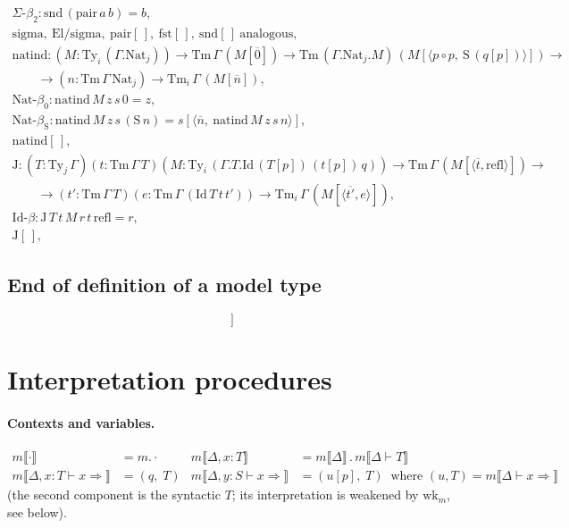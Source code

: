 \[\begin{array}{l}
    \Sigma\text{-}\beta_2 :
        \mathrm{snd}\,(\mathrm{pair}\,a\,b)=b,\\
    \mathrm{sigma},\ \mathrm{El/sigma},
    \ \mathrm{pair}[\,],\ \mathrm{fst}[\,],
    \ \mathrm{snd}[\,]\ \text{analogous},\\
    \mathrm{natind} :
        (M:\mathrm{Ty}_i\,(\Gamma.\mathrm{Nat}_j))
        \to\mathrm{Tm}\,\Gamma\,(M[\overline 0])
        \to\mathrm{Tm}\,(\Gamma.\mathrm{Nat}_j.M)\,
        (M[\langle p\circ p,\ \mathrm S\,(q[p])\rangle])
        \to\\\qquad
        \to(n:\mathrm{Tm}\,\Gamma\,\mathrm{Nat}_j)
        \to\mathrm{Tm}_i\,\Gamma\,(M[\overline n]),\\
    \mathrm{Nat}\text{-}\beta_0 :
        \mathrm{natind}\,M\,z\,s\,0=z,\\
    \mathrm{Nat}\text{-}\beta_{\mathrm S} :
        \mathrm{natind}\,M\,z\,s\,(\mathrm S\,n)=
        s[\langle\overline n,\ \mathrm{natind}\,M\,z\,s
        \,n\rangle],\\
    \mathrm{natind}[\,],\\
    \mathrm J : (T:\mathrm{Ty}_j\,\Gamma)
        (t:\mathrm{Tm}\,\Gamma\,T)
        (M:\mathrm{Ty}_i\,(\Gamma.T.
            \mathrm{Id}\,(T[p])\,(t[p])\,q))
        \to\mathrm{Tm}\,\Gamma\,
            (M[\langle\overline t,\mathrm{refl}\rangle])
            \to\\
        \qquad\to(t':\mathrm{Tm}\,\Gamma\,T)
        (e:\mathrm{Tm}\,\Gamma\,(\mathrm{Id}\,T\,t\,t'))
        \to\mathrm{Tm}_i\,\Gamma\,
        (M[\langle\overline{t'},e\rangle]),\\
    \mathrm{Id}\text{-}\beta :
        \mathrm J\,T\,t\,M\,r\,t\,\mathrm{refl}=
        r,\\ \mathrm J[\,],
\end{array}\]

\subsection{End of definition of a model type}

\[{]}\]

\section{Interpretation procedures}
\label{interpretation-definition}

\paragraph{Contexts and variables.}
\begin{align*}
m\llbracket\cdot\rrbracket &= m.\cdot &
m\llbracket\Delta, x:T\rrbracket &=
    m\llbracket\Delta\rrbracket\,.\,
    m\llbracket\Delta\vdash T\rrbracket\\
m\llbracket\Delta,x:T\vdash x\Rightarrow\rrbracket&=
    (q,\; T) &
m\llbracket\Delta, y:S \vdash x\Rightarrow\rrbracket &=
    (u[p],\; T)\ \text{ where }
(u,T)=m\llbracket\Delta\vdash x\Rightarrow\rrbracket
\end{align*}
(the second component is the syntactic $T$; its
interpretation is weakened by $\mathrm{wk}_m$, see
below).

